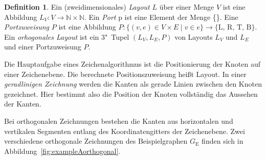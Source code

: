 \documentclass[a4paper]{scrreprt}
\theoremstyle{definition}
\newtheorem{definition}[satz]{Definition}
\newcommand{\N}{\mathbb{N}}
\begin{document}
\begin{definition}
  \label{def:layouts}
  Ein (zweidimensionales) \emph{Layout} $L$ über einer Menge $V$ ist eine Abbildung $L_V : V \to \N \times \N $. Ein \emph{Port} p ist eine Element der Menge \{\}. Eine \emph{Portzuweisung} $P$ ist eine Abbildung $P: \{(v, e) \in V \times E \mid v \in e\} \to \{\text{L, R, T, B}\}$. Ein \emph{orhogonales Layout} ist ein 3"~Tupel $(L_V,L_E,P)$ von Layouts $L_V$ und $L_E$ und einer Portzuweisung $P$.
\end{definition}

Die Hauptaufgabe eines Zeichenalgorithmus ist die Positionierung der Knoten auf einer Zeichenebene. Die berechnete Positionszuweisung heißt Layout. In einer \emph{geradlinigen Zeichnung} werden die Kanten als gerade Linien zwischen den Knoten gezeichnet. Hier bestimmt also die Position der Knoten vollständig das Aussehen der Kanten.

Bei orthogonalen Zeichnungen bestehen die Kanten aus horizontalen und vertikalen Segmenten entlang des Koordinatengitters der Zeichenebene. Zwei verschiedene orthogonale Zeichnungen des Beispielgraphen $G_\text{E}$ finden sich in Abbildung~\ref{fig:exampleAorthogonal}.
\end{document}
